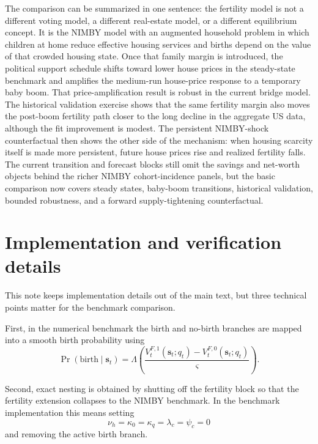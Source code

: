 \documentclass[11pt]{article}
\begin{document}
The comparison can be summarized in one sentence: the fertility model is not a different voting
model, a different real-estate model, or a different equilibrium concept. It is the NIMBY model
with an augmented household problem in which children at home reduce effective housing services and
births depend on the value of that crowded housing state. Once that family margin is introduced,
the political support schedule shifts toward lower house prices in the steady-state benchmark and
amplifies the medium-run house-price response to a temporary baby boom. That price-amplification
result is robust in the current bridge model. The historical validation exercise shows that the
same fertility margin also moves the post-boom fertility path closer to the long decline in the
aggregate US data, although the fit improvement is modest. The persistent NIMBY-shock
counterfactual then shows the other side of the mechanism: when housing scarcity itself is made
more persistent, future house prices rise and realized fertility falls. The
current transition and forecast blocks still omit the savings and net-worth objects behind the
richer NIMBY cohort-incidence panels, but the basic comparison now covers steady states, baby-boom
transitions, historical validation, bounded robustness, and a forward supply-tightening
counterfactual.

\appendix

\section{Implementation and verification details}

This note keeps implementation details out of the main text, but three technical points matter for
the benchmark comparison.

First, in the numerical benchmark the birth and no-birth branches are mapped into a smooth birth
probability using
\begin{equation}
\Pr(\text{birth} \mid \mathbf{s}_t) =
\Lambda\left(\frac{V^{F,1}_t(\mathbf{s}_t; q_t)-V^{F,0}_t(\mathbf{s}_t; q_t)}{\varsigma}\right).
\end{equation}

Second, exact nesting is obtained by shutting off the fertility block so that the fertility
extension collapses to the NIMBY benchmark. In the benchmark implementation this means setting
\begin{equation}
\nu_h = \kappa_0 = \kappa_q = \lambda_c = \psi_c = 0
\end{equation}
and removing the active birth branch.
\end{document}
